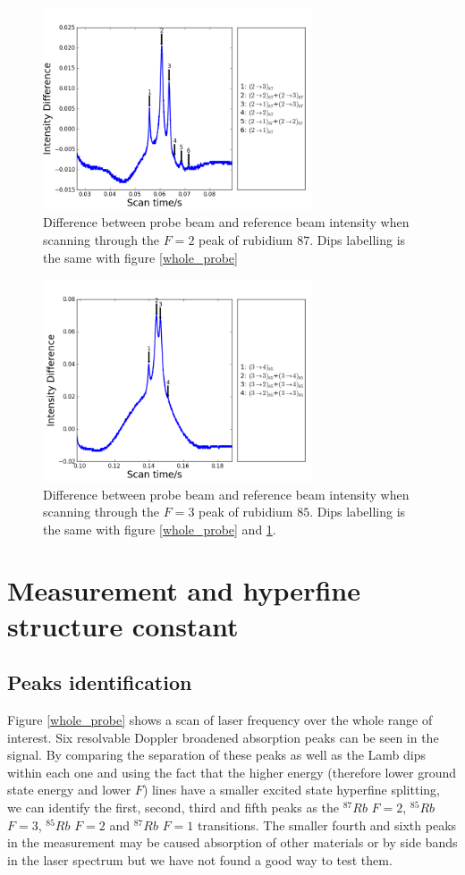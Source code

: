 \documentclass[aps,twocolumn,secnumarabic,balancelastpage,amsmath,amssymb,nofootinbib]{revtex4}
\begin{document}
\begin{figure}
  \includegraphics[width=8cm]{../all_data/4-18/20130418-12_52_13_balance.png}
  \caption{Difference between probe beam and reference beam intensity when scanning through the $F=2$ peak of rubidium $87$. Dips labelling is the same with figure \ref{whole_probe}}
  \label{rb87_diff}
\end{figure}

\begin{figure}
  \includegraphics[width=8cm]{../all_data/4-18/20130418-13_0_10_balance_2.png}
  \caption{Difference between probe beam and reference beam intensity when scanning through the $F=3$ peak of rubidium $85$. Dips labelling is the same with figure \ref{whole_probe} and \ref{rb87_diff}.}
  \label{rb85_diff}
\end{figure}

\section{Measurement and hyperfine structure constant}
\subsection{Peaks identification}
Figure \ref{whole_probe} shows a scan of laser frequency over the whole range of interest. Six resolvable Doppler broadened absorption peaks can be seen in the signal. By comparing the separation of these peaks as well as the Lamb dips within each one and using the fact that the higher energy (therefore lower ground state energy and lower $F$) lines have a smaller excited state hyperfine splitting, we can identify the first, second, third and fifth peaks as the ${}^{87}Rb$ $F=2$, ${}^{85}Rb$ $F=3$, ${}^{85}Rb$ $F=2$ and ${}^{87}Rb$ $F=1$ transitions. The smaller fourth and sixth peaks in the measurement may be caused absorption of other materials or by side bands in the laser spectrum but we have not found a good way to test them.
\end{document}
